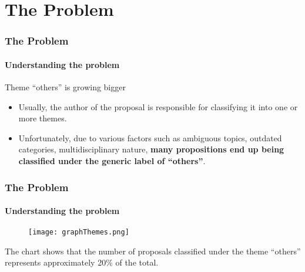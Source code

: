 \section{The Problem}
\begin{frame}
	\frametitle{The Problem}
	\framesubtitle{Understanding the problem}
	\begin{alertblock}{Theme ``others'' is growing bigger}
		\begin{itemize}
			\item 	Usually, the author of the proposal is responsible for classifying it into one or more themes.
			
			
			\item Unfortunately, due to various factors such as ambiguous topics, outdated categories, multidisciplinary nature, \textbf{many propositions end up being classified under the generic label of ``others''}.
			
			
		\end{itemize}
	\end{alertblock}	
\end{frame}
\begin{frame}
	\frametitle{The Problem}
	\framesubtitle{Understanding the problem}	
	\begin{figure}
		\texttt{[image: graphThemes.png]}
	\end{figure}

	\begin{block}{}
		\scriptsize
		The chart shows that the number of proposals classified under the theme “others” represents approximately 20\% of the total. 
	\end{block}	
\end{frame}
